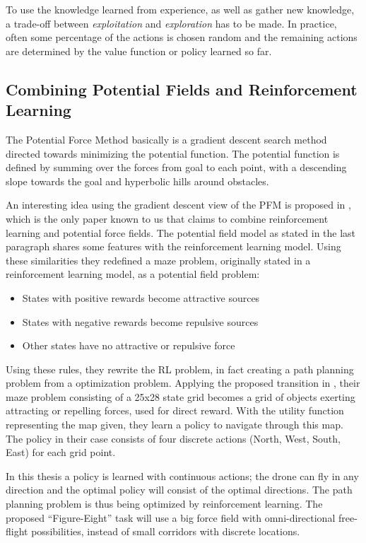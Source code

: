 \documentclass[11pt]{article}
\begin{document}
To use the knowledge learned from experience, as well as gather new knowledge, a trade-off between \emph{exploitation} and \emph{exploration} has to be made. In practice, often some percentage of the actions is chosen random and the remaining actions are determined by the value function or policy learned so far.

\subsection{Combining Potential Fields and Reinforcement Learning}


The Potential Force Method basically is a gradient descent search method directed towards minimizing the potential function. The potential function is defined by summing over the forces from goal to each point, with a descending slope towards the goal and hyperbolic hills around obstacles.

An interesting idea using the gradient descent view of the PFM is proposed in \cite{li-juan08}, which is the only paper known to us that claims to combine reinforcement learning and potential force fields. The potential field model as stated in the last paragraph shares some features with the reinforcement learning model. Using these similarities they redefined a maze problem, originally stated in a reinforcement learning model, as a potential field problem:

\begin{itemize}
 \item States with positive rewards become attractive sources
 \item States with negative rewards become repulsive sources
 \item Other states have no attractive or repulsive force
\end{itemize}

Using these rules, they rewrite the RL problem, in fact creating a path planning problem from a optimization problem. Applying the proposed transition in \cite{li-juan08}, their maze problem consisting of a 25x28 state grid becomes a grid of objects exerting attracting or repelling forces, used for direct reward. With the utility function representing the map given, they learn a policy to navigate through this map. The policy in their case consists of four discrete actions (North, West, South, East) for each grid point.

In this thesis a policy is learned with continuous actions; the drone can fly in any direction and the optimal policy will consist of the optimal directions. The path planning problem is thus being optimized by reinforcement learning. The proposed ``Figure-Eight'' task will use a big force field with omni-directional free-flight possibilities, instead of small corridors with discrete locations.
\end{document}
